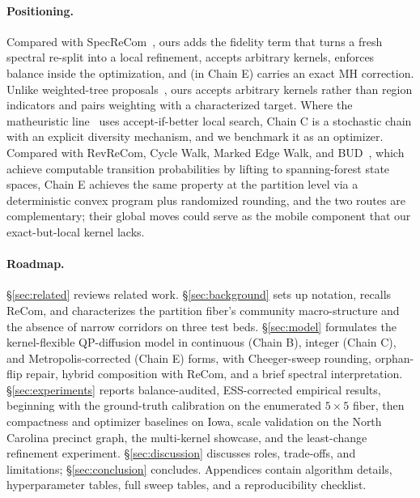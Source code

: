 \documentclass[11pt]{article}
\begin{document}
\paragraph{Positioning.} Compared with
SpecReCom~\cite{davies2025spectral}, ours adds the fidelity term that
turns a fresh spectral re-split into a local refinement, accepts
arbitrary kernels, enforces balance inside the optimization, and (in
Chain E) carries an exact MH correction. Unlike weighted-tree
proposals~\cite{clelland2022colorado,gerrychain2024}, ours accepts
arbitrary kernels rather than region indicators and pairs weighting
with a characterized target. Where the matheuristic
line~\cite{brous2025recom,cannon2023voting} uses accept-if-better
local search, Chain C is a stochastic chain with an explicit
diversity mechanism, and we benchmark it as an optimizer.
Compared with RevReCom, Cycle Walk, Marked Edge Walk, and
BUD~\cite{cannon2022spanning,deford2025cycle,mcwhorter2025marked,
akitaya2026bud}, which achieve computable transition
probabilities by lifting to spanning-forest state spaces, Chain E
achieves the same property at the partition level via a deterministic
convex program plus randomized rounding, and the two routes are
complementary; their global moves could serve as the mobile
component that our exact-but-local kernel lacks.

\paragraph{Roadmap.}\label{sec:intro-roadmap}
\S\ref{sec:related} reviews related work. \S\ref{sec:background} sets
up notation, recalls ReCom, and characterizes the partition fiber's
community macro-structure and the absence of narrow corridors on three test beds.
\S\ref{sec:model} formulates the kernel-flexible QP-diffusion model in
continuous (Chain B), integer (Chain C), and Metropolis-corrected
(Chain E) forms, with Cheeger-sweep rounding, orphan-flip repair,
hybrid composition with ReCom, and a brief spectral interpretation.
\S\ref{sec:experiments} reports balance-audited, ESS-corrected
empirical results, beginning with the ground-truth calibration on
the enumerated $5 \times 5$ fiber, then compactness and optimizer
baselines on Iowa, scale validation on the North Carolina precinct
graph, the multi-kernel showcase, and the least-change refinement
experiment. \S\ref{sec:discussion}
discusses roles, trade-offs, and limitations;
\S\ref{sec:conclusion} concludes. Appendices contain algorithm
details, hyperparameter tables, full sweep tables, and a
reproducibility checklist.
\end{document}
